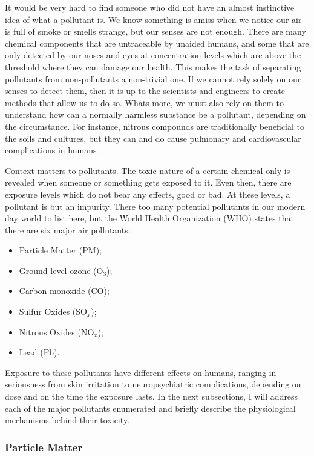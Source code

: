 It would be very hard to find someone who did not have an almost
instinctive idea of what a pollutant is. We know something is amiss when
we notice our air is full of smoke or smells strange, but our senses are
not enough. There are many chemical components that are untraceable by
unaided humans, and some that are only detected by our noses and eyes at
concentration levels which are above the threshold where they can damage
our health. This makes the task of separating pollutants from
non-pollutants a non-trivial one. If we cannot rely solely on our senses
to detect them, then it is up to the scientists and engineers to create
methods that allow us to do so. Whats more, we must also rely on them to
understand how can a normally harmless substance be a pollutant,
depending on the circumstance. For instance, nitrous compounds are
traditionally beneficial to the soils and cultures, but they can and do
cause pulmonary and  cardiovascular complications in
humans~\cite{Kampa2008, Ghorani-Azam2016, Carugno2016}.

Context matters to pollutants. The toxic nature of a certain chemical
only is revealed when someone or something gets exposed to it. Even
then, there are exposure levels which do not bear any effects, good or
bad. At these levels, a pollutant is but an impurity. There too many
potential pollutants in our modern day world to list here, but the World
Health Organization (\gls{WHO}) states that there are six major air
pollutants:
\begin{itemize}
    \item Particle Matter (\gls{PM});
    \item Ground level ozone (O$_3$);
    \item Carbon monoxide (CO);
    \item Sulfur Oxides (SO$_x$);
    \item Nitrous Oxides (NO$_x$);
    \item Lead (Pb).
\end{itemize}

Exposure to these pollutants have different effects on humans, ranging in
seriousness from skin irritation to neuropsychiatric complications,
depending on dose and on the time the exposure lasts. In the next
subsections, I will address each of the major pollutants enumerated and
briefly describe the physiological mechanisms behind their toxicity.

\subsubsection{Particle Matter}%
\label{ssub:particle_matter}

